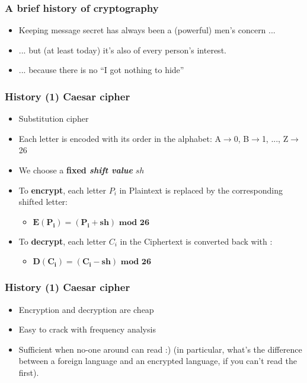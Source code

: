 \documentclass[
hyperref={pdfpagelabels=false}
,xcolor=table
]
{beamer}
\newcommand{\plus}{{\texttt{[image: plus.png]}}}
\newcommand{\minus}{{\texttt{[image: minus.png]}}}
\begin{document}
\begin{frame}
  \frametitle{A brief history of cryptography}

  \begin{itemize}
  \item Keeping message secret has always been a (powerful) men's
    concern ...
  \item  ... but (at least today) it's also of every person's interest. 
  \item ... because there is no ``I got nothing to hide'' 
  \end{itemize}
\end{frame}



\begin{frame}
  \frametitle{History (1) Caesar cipher}

  \begin{itemize}
  \item Substitution cipher
  \item Each letter is encoded with its order in the alphabet: A$\rightarrow$0, B$\rightarrow$1, ..., Z$\rightarrow$26
  \item We choose a \textbf{fixed \textit{shift value}} $sh$
  \item To \textbf{encrypt}, each letter $P_i$ in Plaintext is replaced by the corresponding shifted letter:
    \begin{itemize}
    \item[] $\bm{E(P_i) = (P_i + sh) \mbox{ mod } 26}$
    \end{itemize}
  \item To \textbf{decrypt}, each letter $C_i$ in the Ciphertext is converted back with :
    \begin{itemize}
    \item[] $\bm{D(C_i) = (C_i - sh) \mbox{ mod } 26}$ 
    \end{itemize}
  \end{itemize}

  
\end{frame}



\begin{frame}
  \frametitle{History (1) Caesar cipher}
 
  \begin{itemize}
  \item[\plus] Encryption and decryption are cheap
  \item[\minus] Easy to crack with frequency analysis
  \item[\minus] Sufficient when no-one around can read :) (in
    particular, what's the difference between a foreign language and
    an encrypted language, if you can't read the first).
  \end{itemize}
\end{frame}
\end{document}
